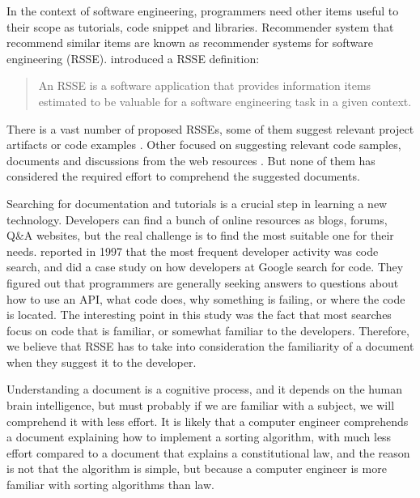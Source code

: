 \documentclass[12pt,mscthesis]{usiinfthesis}
\begin{document}
	  In the context of software engineering, programmers need other items useful to their scope as tutorials, code snippet and libraries. Recommender system that recommend similar items are known as recommender systems for software engineering (RSSE). \citet{RecommendationSystemsforSoftwareEngineering} introduced a RSSE definition:\\
	\blockquote{An RSSE is a software application that provides information items estimated to be valuable for a software engineering task in a given context.}
	

	There is a vast number of proposed RSSEs, some of them suggest relevant project artifacts or code examples \cite{Holmes:2005:USC:1062455.1062491} \cite{Cubranic:2003:HRP:776816.776866} \cite{Zimmermann:2004:MVH:998675.999460}. Other focused on suggesting relevant code samples, documents and discussions from the web resources \cite{Rahman:2015:RRS:2886444.2886471} \cite{Sawadsky:2011:FTC:1984708.1984722} \cite{Stylos:2006:MWT:1174509.1174678} \cite{10.1109/VLHCC.2012.6344497}. But none of them has considered the required effort to comprehend the suggested documents.


	Searching for documentation and tutorials is a crucial step in learning a new technology. Developers can find a bunch of online resources as blogs, forums, Q\&A websites, but the real challenge is to find the most suitable one for their needs. \citet{Singer-1997} reported in 1997 that the most frequent developer activity was code search, and \citet{Sadowski:2015} did a case study on how developers at Google search for code. They figured out that programmers are generally seeking answers to questions about how to use an API, what code does, why something is failing, or where the code is located. The interesting point in this study was the fact that most searches focus on code that is familiar, or somewhat familiar to the developers.
	Therefore, we believe that RSSE has to take into consideration the familiarity of a document when they suggest it to the developer. 

	
	Understanding a document is a cognitive process, and it depends on the human brain intelligence, but must probably if we are familiar with a subject, we will comprehend it with less effort. It is likely that a computer engineer comprehends a document explaining how to implement a sorting algorithm, with much less effort compared to a document that explains a constitutional law, and the reason is not that the algorithm is simple, but because a computer engineer is more familiar with sorting algorithms than law.
	
\end{document}
